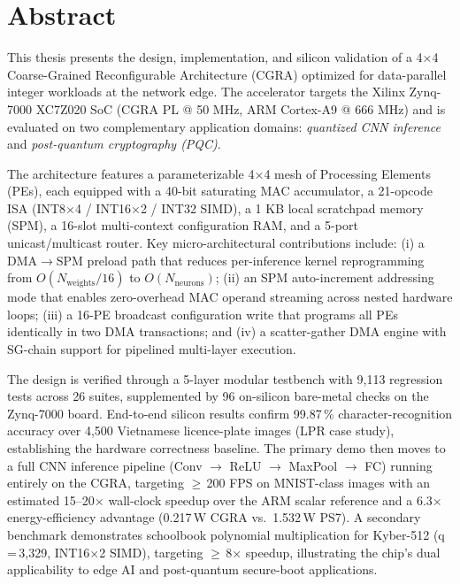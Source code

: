 \section*{Abstract}

This thesis presents the design, implementation, and silicon validation of a
4$\times$4 Coarse-Grained Reconfigurable Architecture (CGRA) optimized for
data-parallel integer workloads at the network edge.
The accelerator targets the Xilinx Zynq-7000 XC7Z020 SoC (CGRA PL @ 50 MHz,
ARM Cortex-A9 @ 666 MHz) and is evaluated on two complementary application
domains: \textit{quantized CNN inference} and \textit{post-quantum
cryptography (PQC)}.

The architecture features a parameterizable 4$\times$4 mesh of Processing
Elements (PEs), each equipped with a 40-bit saturating MAC accumulator,
a 21-opcode ISA (INT8$\times$4 / INT16$\times$2 / INT32 SIMD), a 1 KB local
scratchpad memory (SPM), a 16-slot multi-context configuration RAM, and a
5-port unicast/multicast router.  Key micro-architectural contributions
include: (i) a DMA$\rightarrow$SPM preload path that reduces per-inference
kernel reprogramming from $O(N_\text{weights}/16)$ to $O(N_\text{neurons})$;
(ii) an SPM auto-increment addressing mode that enables zero-overhead MAC
operand streaming across nested hardware loops; (iii) a 16-PE broadcast
configuration write that programs all PEs identically in two DMA
transactions; and (iv) a scatter-gather DMA engine with SG-chain support
for pipelined multi-layer execution.

The design is verified through a 5-layer modular testbench with
9{,}113 regression tests across 26 suites, supplemented by 96 on-silicon
bare-metal checks on the Zynq-7000 board.
End-to-end silicon results confirm 99.87\,\% character-recognition accuracy
over 4{,}500 Vietnamese licence-plate images (LPR case study), establishing
the hardware correctness baseline.
The primary demo then moves to a full CNN inference pipeline (Conv
$\rightarrow$ ReLU $\rightarrow$ MaxPool $\rightarrow$ FC) running entirely
on the CGRA, targeting $\geq$\,200 FPS on MNIST-class images with an
estimated 15--20$\times$ wall-clock speedup over the ARM scalar reference
and a 6.3$\times$ energy-efficiency advantage (0.217\,W CGRA vs.\
1.532\,W PS7).
A secondary benchmark demonstrates schoolbook polynomial multiplication for
Kyber-512 (q\,=\,3{,}329, INT16$\times$2 SIMD), targeting $\geq$\,8$\times$
speedup, illustrating the chip's dual applicability to edge AI and
post-quantum secure-boot applications.
